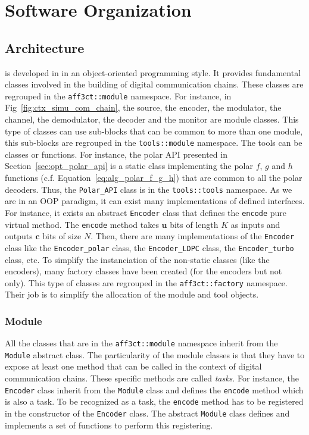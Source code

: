 \section{Software Organization}
\label{sec:aff3ct_orga}

\subsection{Architecture}

\AFFECT is developed in \Cxx in an object-oriented programming style. It
provides fundamental classes involved in the building of digital communication
chains. These classes are regrouped in the \verb|aff3ct::module| namespace. For
instance, in Fig~\ref{fig:ctx_simu_com_chain}, the source, the encoder, the
modulator, the channel, the demodulator, the decoder and the monitor are module
classes. This type of classes can use sub-blocks that can be common to more than
one module, this sub-blocks are regrouped in the \verb|tools::module| namespace.
The tools can be classes or functions. For instance, the polar API presented in
Section~\ref{sec:opt_polar_api} is a static class implementing the polar $f$,
$g$ and $h$ functions (c.f. Equation~\ref{eq:alg_polar_f_g_h}) that are common
to all the polar decoders. Thus, the \verb|Polar_API| class is in the
\verb|tools::tools| namespace. As we are in an OOP paradigm, it can exist many
implementations of defined interfaces. For instance, it exists an abstract
\verb|Encoder| class that defines the \verb|encode| pure virtual method. The
\verb|encode| method takes $\bm{u}$ bits of length $K$ as inputs and outputs
$\bm{c}$ bits of size $N$. Then, there are many implementations of the
\verb|Encoder| class like the \verb|Encoder_polar| class, the
\verb|Encoder_LDPC| class, the \verb|Encoder_turbo| class, etc. To simplify the
instanciation of the non-static classes (like the encoders), many factory
classes have been created (for the encoders but not only). This type of classes
are regrouped in the \verb|aff3ct::factory| namespace. Their job is to simplify
the allocation of the module and tool objects.

\subsubsection{Module}

All the classes that are in the \verb|aff3ct::module| namespace inherit from the
\verb|Module| abstract class. The particularity of the module classes is that
they have to expose at least one method that can be called in the context of
digital communication chains. These specific methods are called \emph{tasks}.
For instance, the \verb|Encoder| class inherit from the \verb|Module| class and
defines the \verb|encode| method which is also a task. To be recognized as a
task, the \verb|encode| method has to be registered in the constructor of the
\verb|Encoder| class. The abstract \verb|Module| class defines and implements a
set of functions to perform this registering.

